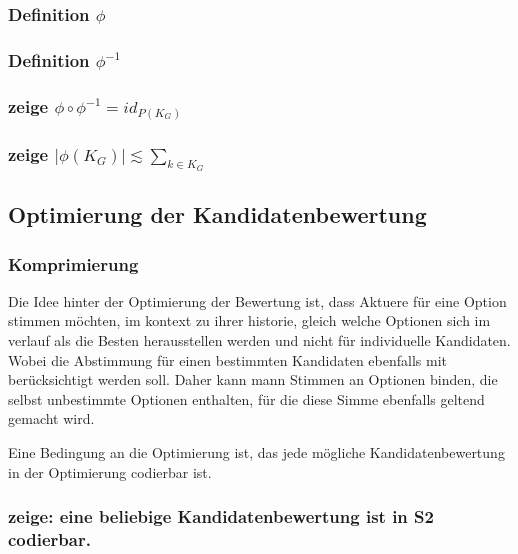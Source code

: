 \documentclass[]{article}
\begin{document}
\subsubsection*{Definition $\phi$}


\subsubsection*{Definition $\phi^{-1}$}


\subsubsection*{zeige $\phi\circ\phi^{-1} = id_{P(K_G)}$}
  

\subsubsection*{zeige $|\phi(K_G)| \lesssim \sum_{k\in K_G}$}



\subsection{Optimierung der Kandidatenbewertung}

\subsubsection*{Komprimierung}

Die Idee hinter der Optimierung der Bewertung ist, dass Aktuere für eine Option stimmen möchten, im kontext zu ihrer historie, gleich welche Optionen sich im verlauf als die Besten herausstellen werden und nicht für individuelle Kandidaten. Wobei die Abstimmung für einen bestimmten Kandidaten ebenfalls mit berücksichtigt werden soll.
Daher kann mann Stimmen an Optionen binden, die selbst unbestimmte Optionen enthalten, für die diese Simme ebenfalls geltend gemacht wird.

Eine Bedingung an die Optimierung ist, das jede mögliche Kandidatenbewertung in der Optimierung codierbar ist. 


\subsubsection*{zeige: eine beliebige Kandidatenbewertung ist in S2 codierbar.}
\end{document}
